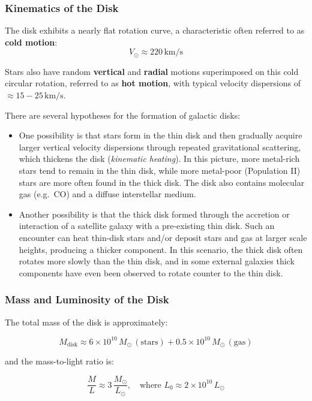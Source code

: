 \subsubsection{Kinematics of the Disk}

The disk exhibits a nearly flat rotation curve, a characteristic often referred to as \textbf{cold motion}:
$$
V_\odot \approx 220\,\mathrm{km/s}
$$

Stars also have random \textbf{vertical} and \textbf{radial} motions superimposed on this cold circular rotation, referred to as \textbf{hot motion}, with typical velocity dispersions of $\approx 15-25\,\mathrm{km/s}$.

There are several hypotheses for the formation of galactic disks:

\begin{itemize}
    \item One possibility is that stars form in the thin disk and then gradually acquire larger vertical velocity dispersions through repeated gravitational scattering, which thickens the disk (\textit{kinematic heating}). In this picture, more metal-rich stars tend to remain in the thin disk, while more metal-poor (Population II) stars are more often found in the thick disk. The disk also contains molecular gas (e.g.\ CO) and a diffuse interstellar medium.
    
    \item Another possibility is that the thick disk formed through the accretion or interaction of a satellite galaxy with a pre-existing thin disk. Such an encounter can heat thin-disk stars and/or deposit stars and gas at larger scale heights, producing a thicker component. In this scenario, the thick disk often rotates more slowly than the thin disk, and in some external galaxies thick components have even been observed to rotate counter to the thin disk.
\end{itemize}

\subsubsection{Mass and Luminosity of the Disk}

The total mass of the disk is approximately:

$$
M_\mathrm{disk} \approx 6 \times 10^{10}\,M_\odot\,(\text{stars}) + 0.5 \times 10^{10}\,M_\odot\,(\text{gas})
$$

and the mass-to-light ratio is:

$$
\frac{M}{L} \approx 3\,\frac{M_\odot}{L_\odot}, \quad \text{where } L_0 \approx 2 \times 10^{10}\,L_\odot
$$

